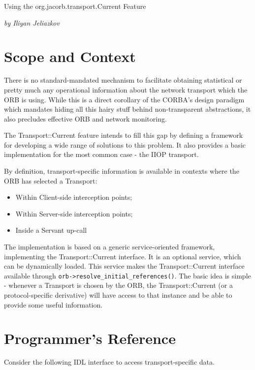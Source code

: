 %

Using the org.jacorb.transport.Current Feature

\emph{by Iliyan Jeliazkov}

\section{Scope and Context}

There is no standard-mandated mechanism to facilitate obtaining statistical or pretty
much any operational information about the network transport which the ORB is using.
While this is a direct corollary of the CORBA's design paradigm which mandates hiding
all this hairy stuff behind non-transparent abstractions, it also precludes effective
ORB and network monitoring.

The Transport::Current feature intends to fill this gap by defining a framework
for developing a wide range of solutions to this problem. It also provides a basic
implementation for the most common case - the IIOP transport.

By definition, transport-specific information is available in contexts where the
ORB has selected a Transport:

\begin{itemize}
\item Within Client-side interception points;
\item Within Server-side interception points;
\item Inside a Servant up-call
\end{itemize}

The implementation is based on a generic service-oriented framework, implementing
the Transport::Current interface. It is an optional service, which can be dynamically
loaded. This service makes the Transport::Current interface available through
{\tt orb->resolve\_initial\_references()}. The basic idea is simple - whenever a Transport
is chosen by the ORB, the Transport::Current (or a protocol-specific derivative)
will have access to that instance and be able to provide some useful information.



\section{Programmer's Reference}

Consider the following IDL interface to access transport-specific data.

